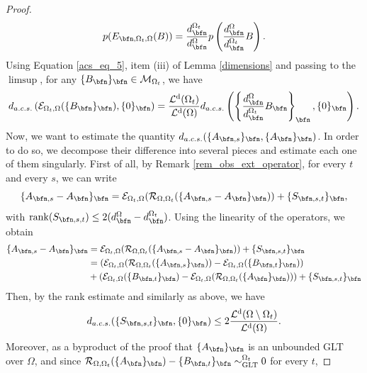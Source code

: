 \documentclass{amsart}
\DeclareMathOperator{\Ld}{\mathcal{L}^d}
\begin{document}
\begin{proof}
   \begin{equation}\label{acs_eq_5}
       p(E_{\bfn,\Omega_t,\Omega}(B))=\frac{d_\bfn^{\Omega_t}}{d_\bfn^{\Omega}}p\left(\frac{d_\bfn^{\Omega}}{d_\bfn^{\Omega_t}}B\right).
   \end{equation}
   Using Equation \eqref{acs_eq_5}, item (iii) of Lemma \ref{dimensions} and passing to the $\limsup$, for any $\{B_\bfn\}_\bfn\in\mathcal{M}_{\Omega_t}$, we have
   \begin{equation}\label{acs_eq_6}
       d_{a.c.s.}\left(\mathcal{E}_{\Omega_t,\Omega}(\{B_\bfn\}_\bfn),\{0\}_\bfn\right)=\frac{\Ld(\Omega_t)}{\Ld(\Omega)}d_{a.c.s.}\left(\left\{\frac{d_\bfn^{\Omega}}{d_\bfn^{\Omega_t}}B_\bfn\right\}_\bfn,\{0\}_\bfn\right).
   \end{equation}
   Now, we want to estimate the quantity $d_{a.c.s.}(\{A_{\bfn,s}\}_\bfn,\{A_{\bfn}\}_\bfn)$. In order to do so, we decompose their difference into several pieces and estimate each one of them singularly. First of all, by Remark \ref{rem_obs_ext_operator}, for every $t$ and every $s$, we can write
   \begin{equation*}
       \{A_{\bfn,s}-A_\bfn\}_\bfn =\mathcal{E}_{\Omega_t,\Omega}(\mathcal{R}_{\Omega,\Omega_t}(\{A_{\bfn,s}-A_\bfn\}_\bfn))+\{S_{\bfn,s,t}\}_\bfn,
   \end{equation*}
   with $\mathrm{rank}(S_{\bfn,s,t})\leq 2(d_\bfn^{\Omega}-d_\bfn^{\Omega_t})$. Using the linearity of the operators, we obtain 
   \begin{align}\label{acs_eq_extra}
       \{A_{\bfn,s}-A_\bfn\}_\bfn &=\mathcal{E}_{\Omega_t,\Omega}(\mathcal{R}_{\Omega,\Omega_t}(\{A_{\bfn,s}-A_\bfn\}_\bfn))+\{S_{\bfn,s,t}\}_\bfn\\
       \nonumber&=\left(\mathcal{E}_{\Omega_t,\Omega}(\mathcal{R}_{\Omega,\Omega_t}(\{A_{\bfn,s}\}_\bfn))-\mathcal{E}_{\Omega_t,\Omega}(\{B_{\bfn,t}\}_\bfn)\right)\\
       \nonumber&+\left(\mathcal{E}_{\Omega_t,\Omega}(\{B_{\bfn,t}\}_\bfn)-\mathcal{E}_{\Omega_t,\Omega}(\mathcal{R}_{\Omega,\Omega_t}(\{A_{\bfn}\}_\bfn))\right)+\{S_{\bfn,s,t}\}_\bfn\\
   \end{align}
   Then, by the rank estimate and similarly as above, we have
   \begin{equation}\label{acs_eq_7}
       d_{a.c.s.}(\{S_{\bfn,s,t}\}_\bfn,\{0\}_\bfn)\leq 2\frac{\Ld(\Omega\setminus\Omega_t)}{\Ld(\Omega)}.
   \end{equation}
   Moreover, as a byproduct of the proof that $\{A_\bfn\}_\bfn$ is an unbounded GLT over $\Omega$, and since $\mathcal{R}_{\Omega,\Omega_t}(\{A_\bfn\}_\bfn)-\{B_{\bfn,t}\}_\bfn\sim_{\mathrm{GLT}}^{\Omega_t}0$ for every $t$,

\end{proof}
\end{document}
